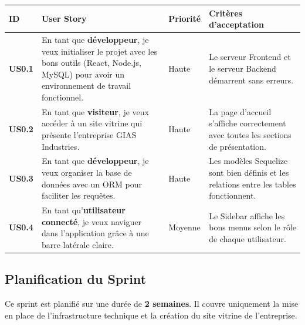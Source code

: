 \begin{center}
\begin{tabular}{|p{1cm}|p{6cm}|p{2cm}|p{5cm}|}
\hline
\textbf{ID} & \textbf{User Story} & \textbf{Priorité} & \textbf{Critères d'acceptation} \\ \hline
\textbf{US0.1} & En tant que \textbf{développeur}, je veux initialiser le projet avec les bons outils (React, Node.js, MySQL) pour avoir un environnement de travail fonctionnel. & Haute & Le serveur Frontend et le serveur Backend démarrent sans erreurs. \\ \hline
\textbf{US0.2} & En tant que \textbf{visiteur}, je veux accéder à un site vitrine qui présente l'entreprise GIAS Industries. & Haute & La page d'accueil s'affiche correctement avec toutes les sections de présentation. \\ \hline
\textbf{US0.3} & En tant que \textbf{développeur}, je veux organiser la base de données avec un ORM pour faciliter les requêtes. & Haute & Les modèles Sequelize sont bien définis et les relations entre les tables fonctionnent. \\ \hline
\textbf{US0.4} & En tant qu'\textbf{utilisateur connecté}, je veux naviguer dans l'application grâce à une barre latérale claire. & Moyenne & Le Sidebar affiche les bons menus selon le rôle de chaque utilisateur. \\ \hline
\end{tabular}
\end{center}

\subsection{Planification du Sprint}
Ce sprint est planifié sur une durée de \textbf{2 semaines}. Il couvre uniquement la mise en place de l'infrastructure technique et la création du site vitrine de l'entreprise.
